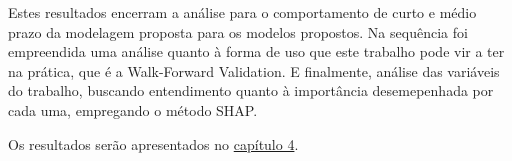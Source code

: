 Estes resultados encerram a análise para o comportamento de curto e médio prazo da modelagem proposta para os modelos propostos. Na sequência foi empreendida uma análise quanto à forma de uso que este trabalho pode vir a ter na prática, que é a Walk-Forward Validation. E finalmente, análise das variáveis do trabalho, buscando entendimento quanto à importância desemepenhada por cada uma, empregando o método SHAP.



Os resultados serão apresentados no \hyperref[cap:capitulo4]{capítulo 4}.
\clearpage


